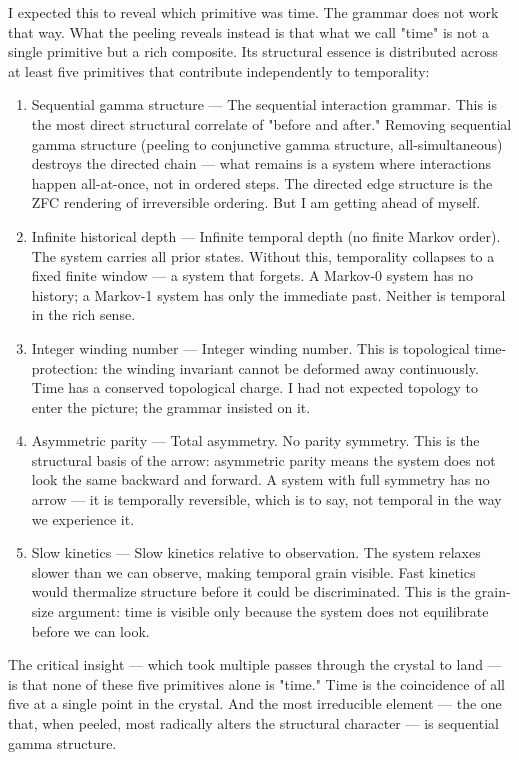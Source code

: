 \documentclass[12pt,a4paper]{article}
\begin{document}
I expected this to reveal which primitive was time. The grammar does not work that way. What the peeling reveals instead is that what we call "time" is not a single primitive but a rich composite. Its structural essence is distributed across at least five primitives that contribute independently to temporality:

\begin{enumerate}
    \item Sequential gamma structure --- The sequential interaction grammar. This is the most direct structural correlate of "before and after." Removing sequential gamma structure (peeling to conjunctive gamma structure, all-simultaneous) destroys the directed chain --- what remains is a system where interactions happen all-at-once, not in ordered steps. The directed edge structure is the ZFC rendering of irreversible ordering. But I am getting ahead of myself.
    \item Infinite historical depth --- Infinite temporal depth (no finite Markov order). The system carries all prior states. Without this, temporality collapses to a fixed finite window --- a system that forgets. A Markov-0 system has no history; a Markov-1 system has only the immediate past. Neither is temporal in the rich sense.
    \item Integer winding number --- Integer winding number. This is topological time-protection: the winding invariant cannot be deformed away continuously. Time has a conserved topological charge. I had not expected topology to enter the picture; the grammar insisted on it.
    \item Asymmetric parity --- Total asymmetry. No parity symmetry. This is the structural basis of the arrow: asymmetric parity means the system does not look the same backward and forward. A system with full symmetry has no arrow --- it is temporally reversible, which is to say, not temporal in the way we experience it.
    \item Slow kinetics --- Slow kinetics relative to observation. The system relaxes slower than we can observe, making temporal grain visible. Fast kinetics would thermalize structure before it could be discriminated. This is the grain-size argument: time is visible only because the system does not equilibrate before we can look.
\end{enumerate}

The critical insight --- which took multiple passes through the crystal to land --- is that none of these five primitives alone is "time." Time is the coincidence of all five at a single point in the crystal. And the most irreducible element --- the one that, when peeled, most radically alters the structural character --- is sequential gamma structure.
\end{document}
